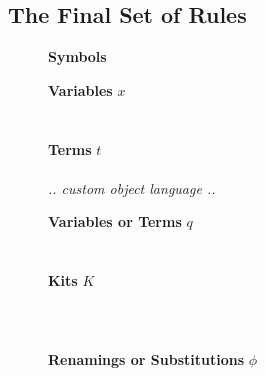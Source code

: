 \documentclass[screen,nonacm]{acmart}
\begin{document}
\subsection{The Final Set of Rules}\label{sec:ags-rls}
\begin{figure}[t]
      \centering
      \small
      {\raggedright \textbf{\Large Symbols} \par}
      \vspace{1.5em}

      \begin{minipage}[t]{0.48\textwidth}
            \raggedright{}
            \textbf{Variables} $x$ \\
            \vspace{0.5em}
            \AZero{}\\
            \ASuc{}\\
            \vspace{1em}
            \textbf{Terms} $t$ \\
            \vspace{0.5em}
            \AVarC{}\\
            \emph{.. custom object language ..}\\
            \AAppKit{}      
      \end{minipage}
      \hfill
      \begin{minipage}[t]{0.48\textwidth}
            \raggedright{}
            \textbf{Variables or Terms} $q$\\
            \vspace{0.5em}
            \ALookup{}\\
            \ALookOrApp{}\\
            \vspace{1em} 
            \textbf{Kits} $K$ \\
            \vspace{0.5em}
            \AKRen{}\\
            \AKSub{}\\
            \AKLub{}\\
            \vspace{1em}
            \textbf{Renamings or Substitutions} $ϕ$\\
            \vspace{0.5em}
            \AId{}\\
            \AWk{}\\
            \AExtend{}\\
            \AComp{}\\
      \end{minipage}
      

\end{figure}
\end{document}
